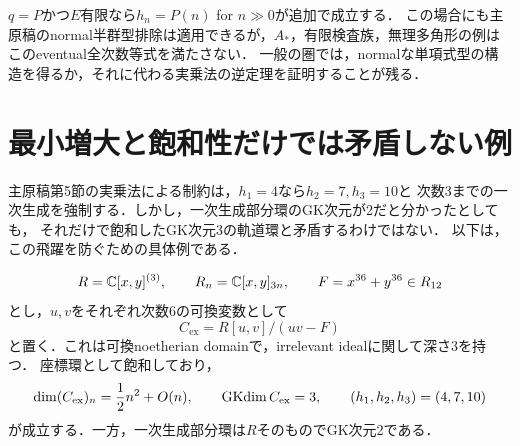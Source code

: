 \documentclass[11pt,a4paper]{ltjsarticle}
\begin{document}
$q=P$かつ$E$有限なら$h_n=P(n)$ for $n\gg0$が追加で成立する．
この場合にも主原稿のnormal半群型排除は適用できるが，$A_*$，有限検査族，無理多角形の例は
このeventual全次数等式を満たさない．
一般の圏では，normalな単項式型の構造を得るか，それに代わる実乗法の逆定理を証明することが残る．


\section{最小増大と飽和性だけでは矛盾しない例}\label{sec:minimalgrowth-example}
主原稿第5節の実乗法による制約は，$h_1=4$なら$h_2=7,h_3=10$と
次数3までの一次生成を強制する．しかし，一次生成部分環のGK次元が2だと分かったとしても，
それだけで飽和したGK次元3の軌道環と矛盾するわけではない．
以下は，この飛躍を防ぐための具体例である．

\begin{example}\label{ex:minimalgrowth-ring}
\[
 R=\mathbb C[x,y]^{(3)},\qquad R_n=\mathbb C[x,y]_{3n},\qquad
 F=x^{36}+y^{36}\in R_{12}
\]
とし，$u,v$をそれぞれ次数6の可換変数として
\[
 C_{\mathrm{ex}}=R[u,v]/(uv-F)
\]
と置く．これは可換noetherian domainで，irrelevant idealに関して深さ3を持つ．
座標環として飽和しており，
\[
 \dim(C_{\mathrm{ex}})_n=\frac12n^2+O(n),\qquad
 \operatorname{GKdim} C_{\mathrm{ex}}=3,\qquad
 (h_1,h_2,h_3)=(4,7,10)
\]
が成立する．一方，一次生成部分環は$R$そのものでGK次元2である．
\end{example}
\end{document}
